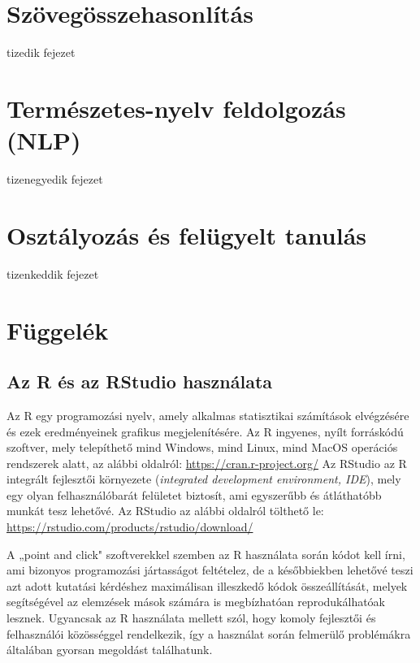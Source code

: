 \documentclass[
]{book}
\begin{document}
\hypertarget{szuxf6veguxf6sszehasonluxedtuxe1s}{%
\chapter{Szövegösszehasonlítás}\label{szuxf6veguxf6sszehasonluxedtuxe1s}}

tizedik fejezet

\hypertarget{termuxe9szetes-nyelv-feldolgozuxe1s-nlp}{%
\chapter{Természetes-nyelv feldolgozás
(NLP)}\label{termuxe9szetes-nyelv-feldolgozuxe1s-nlp}}

tizenegyedik fejezet

\hypertarget{osztuxe1lyozuxe1s-uxe9s-feluxfcgyelt-tanuluxe1s}{%
\chapter{Osztályozás és felügyelt
tanulás}\label{osztuxe1lyozuxe1s-uxe9s-feluxfcgyelt-tanuluxe1s}}

tizenkeddik fejezet

\hypertarget{fuxfcggeluxe9k}{%
\chapter{Függelék}\label{fuxfcggeluxe9k}}

\hypertarget{az-r-uxe9s-az-rstudio-hasznuxe1lata}{%
\section{Az R és az RStudio
használata}\label{az-r-uxe9s-az-rstudio-hasznuxe1lata}}

Az R egy programozási nyelv, amely alkalmas statisztikai számítások
elvégzésére és ezek eredményeinek grafikus megjelenítésére. Az R
ingyenes, nyílt forráskódú szoftver, mely telepíthető mind Windows, mind
Linux, mind MacOS operációs rendszerek alatt, az alábbi oldalról:
\url{https://cran.r-project.org/} Az RStudio az R integrált fejlesztői
környezete (\emph{integrated development environment, IDE}), mely egy
olyan felhasználóbarát felületet biztosít, ami egyszerűbb és átláthatóbb
munkát tesz lehetővé. Az RStudio az alábbi oldalról tölthető le:
\url{https://rstudio.com/products/rstudio/download/}

A „point and click" szoftverekkel szemben az R használata során kódot
kell írni, ami bizonyos programozási jártasságot feltételez, de a
későbbiekben lehetővé teszi azt adott kutatási kérdéshez maximálisan
illeszkedő kódok összeállítását, melyek segítségével az elemzések mások
számára is megbízhatóan reprodukálhatóak lesznek. Ugyancsak az R
használata mellett szól, hogy komoly fejlesztői és felhasználói
közösséggel rendelkezik, így a használat során felmerülő problémákra
általában gyorsan megoldást találhatunk.
\end{document}
